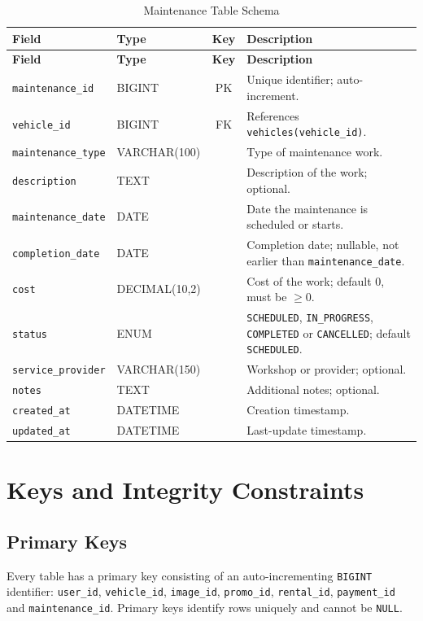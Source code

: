 \documentclass[10pt,a4paper]{report}
\newcommand{\col}[1]{\texttt{#1}}
\begin{document}
{\begin{longtable}{@{}llc>{\raggedright\arraybackslash}p{6.6cm}@{}}
\caption{Maintenance Table Schema}\label{tab:maintenance}\\
\toprule \textbf{Field} & \textbf{Type} & \textbf{Key} & \textbf{Description}\\ \midrule \endfirsthead
\toprule \textbf{Field} & \textbf{Type} & \textbf{Key} & \textbf{Description}\\ \midrule \endhead
\bottomrule \endfoot
\col{maintenance_id} & BIGINT & PK & Unique identifier; auto-increment.\\
\col{vehicle_id} & BIGINT & FK & References \col{vehicles(vehicle_id)}.\\
\col{maintenance_type} & VARCHAR(100) & & Type of maintenance work.\\
\col{description} & TEXT & & Description of the work; optional.\\
\col{maintenance_date} & DATE & & Date the maintenance is scheduled or starts.\\
\col{completion_date} & DATE & & Completion date; nullable, not earlier than \col{maintenance_date}.\\
\col{cost} & DECIMAL(10,2) & & Cost of the work; default 0, must be $\geq 0$.\\
\col{status} & ENUM & & \col{SCHEDULED}, \col{IN_PROGRESS}, \col{COMPLETED} or \col{CANCELLED}; default \col{SCHEDULED}.\\
\col{service_provider} & VARCHAR(150) & & Workshop or provider; optional.\\
\col{notes} & TEXT & & Additional notes; optional.\\
\col{created_at} & DATETIME & & Creation timestamp.\\
\col{updated_at} & DATETIME & & Last-update timestamp.\\
\end{longtable}
}

\section{Keys and Integrity Constraints}

\subsection{Primary Keys}
Every table has a primary key consisting of an auto-incrementing \col{BIGINT} identifier: \col{user_id}, \col{vehicle_id}, \col{image_id}, \col{promo_id}, \col{rental_id}, \col{payment_id} and \col{maintenance_id}. Primary keys identify rows uniquely and cannot be \col{NULL}.
\end{document}
